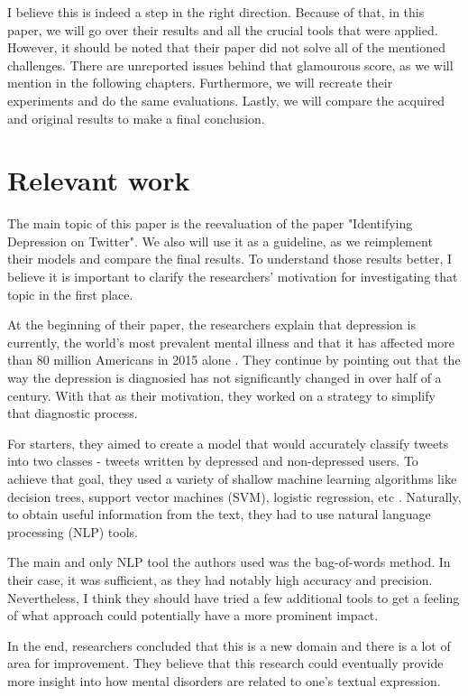 \documentclass[times, utf8, seminar]{fer}
\begin{document}
I believe this is indeed a step in the right direction. Because of that, in this paper, we will go over their results and all the crucial tools that were applied. However, it should be noted that their paper did not solve all of the mentioned challenges. There are unreported issues behind that glamourous score, as we will mention in the following chapters. Furthermore, we will recreate their experiments and do the same evaluations. Lastly, we will compare the acquired and original results to make a final conclusion.

\chapter{Relevant work}

The main topic of this paper is the reevaluation of the paper "Identifying Depression on Twitter".  We also will use it as a guideline, as we reimplement their models and compare the final results. To understand those results better, I believe it is important to clarify the researchers' motivation for investigating that topic in the first place.

At the beginning of their paper, the researchers explain that depression is currently, the world's most prevalent mental illness and that it has affected more than 80 million Americans in 2015 alone \citep{depression}. They continue by pointing out that the way the depression is diagnosied has not significantly changed in over half of a century. With that as their motivation, they worked on a strategy to simplify that diagnostic process. 

For starters, they aimed to create a model that would accurately classify tweets into two classes - tweets written by depressed and non-depressed users. To achieve that goal, they used a variety of shallow machine learning algorithms like decision trees, support vector machines (SVM), logistic regression, etc \citep{depression}. Naturally, to obtain useful information from the text, they had to use natural language processing (NLP) tools. 

The main and only NLP tool the authors used was the bag-of-words method. In their case, it was sufficient, as they had notably high accuracy and precision. Nevertheless, I think they should have tried a few additional tools to get a feeling of what approach could potentially have a more prominent impact. 

In the end, researchers concluded that this is a new domain and there is a lot of area for improvement. They believe that this research could eventually provide more insight into how mental disorders are related to one's textual expression. 
\end{document}
